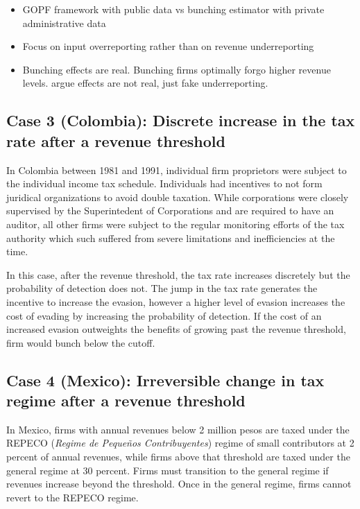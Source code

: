 \documentclass[
  12pt]{article}
\providecommand{\tightlist}{%
  \setlength{\itemsep}{0pt}\setlength{\parskip}{0pt}}\usepackage{longtable,booktabs,array}
\begin{document}
\begin{itemize}
\tightlist
\item
  GOPF framework with public data vs bunching estimator with private
  administrative data
\item
  Focus on input overreporting rather than on revenue underreporting
\item
  Bunching effects are real. Bunching firms optimally forgo higher
  revenue levels. \citet{Almunia2018} argue effects are not real, just
  fake underreporting.
\end{itemize}

\hypertarget{case-3-colombia-discrete-increase-in-the-tax-rate-after-a-revenue-threshold}{%
\subsection{Case 3 (Colombia): Discrete increase in the tax rate after a
revenue
threshold}\label{case-3-colombia-discrete-increase-in-the-tax-rate-after-a-revenue-threshold}}

In Colombia between 1981 and 1991, individual firm proprietors were
subject to the individual income tax schedule. Individuals had
incentives to not form juridical organizations to avoid double taxation.
While corporations were closely supervised by the Superintedent of
Corporations and are required to have an auditor, all other firms were
subject to the regular monitoring efforts of the tax authority which
such suffered from severe limitations and inefficiencies at the time.

In this case, after the revenue threshold, the tax rate increases
discretely but the probability of detection does not. The jump in the
tax rate generates the incentive to increase the evasion, however a
higher level of evasion increases the cost of evading by increasing the
probability of detection. If the cost of an increased evasion outweights
the benefits of growing past the revenue threshold, firm would bunch
below the cutoff.

\hypertarget{case-4-mexico-irreversible-change-in-tax-regime-after-a-revenue-threshold}{%
\subsection{Case 4 (Mexico): Irreversible change in tax regime after a
revenue
threshold}\label{case-4-mexico-irreversible-change-in-tax-regime-after-a-revenue-threshold}}

In Mexico, firms with annual revenues below 2 million pesos are taxed
under the REPECO (\emph{Regime de Pequeños Contribuyentes}) regime of
small contributors at 2 percent of annual revenues, while firms above
that threshold are taxed under the general regime at 30 percent. Firms
must transition to the general regime if revenues increase beyond the
threshold. Once in the general regime, firms cannot revert to the REPECO
regime.
\end{document}
